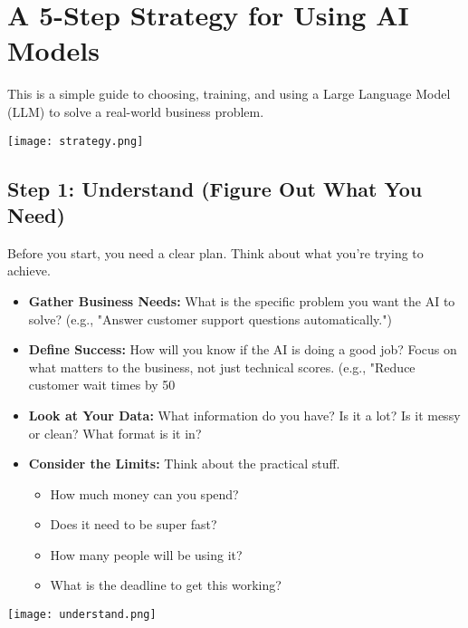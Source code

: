 \documentclass[a4paper, 12pt]{article}
\begin{document}
\newpage
\section*{A 5-Step Strategy for Using AI Models}
This is a simple guide to choosing, training, and using a Large Language Model (LLM) to solve a real-world business problem.
\begin{center}
\texttt{[image: strategy.png]}
\end{center}


\newpage
\subsection*{Step 1: Understand (Figure Out What You Need)}
Before you start, you need a clear plan. Think about what you're trying to achieve.

\begin{itemize}
    \item \textbf{Gather Business Needs:} What is the specific problem you want the AI to solve? (e.g., "Answer customer support questions automatically.")
    \item \textbf{Define Success:} How will you know if the AI is doing a good job? Focus on what matters to the business, not just technical scores. (e.g., "Reduce customer wait times by 50%
    \item \textbf{Look at Your Data:} What information do you have? Is it a lot? Is it messy or clean? What format is it in?
    \item \textbf{Consider the Limits:} Think about the practical stuff.
    \begin{itemize}
        \item How much money can you spend?
        \item Does it need to be super fast?
        \item How many people will be using it?
        \item What is the deadline to get this working?
    \end{itemize}
\end{itemize}

\begin{center}
\texttt{[image: understand.png]}
\end{center}
\end{document}
